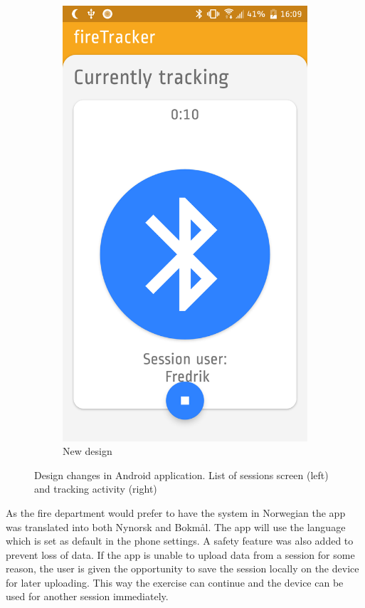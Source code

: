 \documentclass[../Main/thesis.tex]{subfiles}
\begin{document}
\begin{figure}[h]
\begin{subfigure}{0.23\textwidth}
		\includegraphics[width=\textwidth]{../fig/firetracker_app_new_2}
		\caption{New design}
		\label{fig:app-new-design-tracking-iteration3}
	\end{subfigure}
	\caption[Design changes in Android application]{Design changes in Android application. List of sessions screen (left) and tracking activity (right)}
	\label{fig:new-design}
\end{figure}

As the fire department would prefer to have the system in Norwegian the app was translated into both Nynorsk and Bokmål.
The app will use the language which is set as default in the phone settings.
A safety feature was also added to prevent loss of data.
If the app is unable to upload data from a session for some reason, the user is given the opportunity to save the session locally on the device for later uploading.
This way the exercise can continue and the device can be used for another session immediately. 
\end{document}
